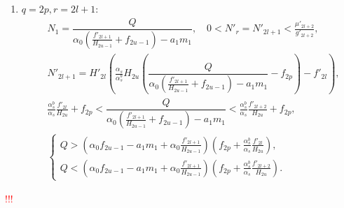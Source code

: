 \begin{enumerate}[leftmargin=10pt,itemindent=26pt]
    \item \(q=2p, r=2l+1\):
    \begin{align*}
        & N_1 = \dfrac{Q}{ \alpha_0 \left( \frac{f'_{2l+1}}{H_{2u-1}} + f_{2u-1} \right) - a_1 m_1 }, \quad 0 < N'_r = N'_{2l+1} < \frac{\mu'_{2l+2}}{g'_{2l+2}}, \\
        & N'_{2l+1} = H'_{2l} \left( \frac{\alpha_s}{\alpha^b_s} H_{2u} \left( \dfrac{Q}{ \alpha_0 \left( \frac{f'_{2l+1}}{H_{2u-1}} + f_{2u-1} \right) - a_1 m_1 } - f_{2p} \right) - f'_{2l} \right), \\
        & \frac{\alpha^b_s}{\alpha_s} \frac{f'_{2l}}{H_{2u}} + f_{2p} < \dfrac{Q}{ \alpha_0 \left( \frac{f'_{2l+1}}{H_{2u-1}} + f_{2u-1} \right) - a_1 m_1 } < \frac{\alpha^b_s}{\alpha_s} \frac{f'_{2l+2}}{H_{2u}} + f_{2p}, \\ 
        & \begin{cases}
            Q > \left( \alpha_0 f_{2u-1} - a_1 m_1  + \alpha_0 \frac{f'_{2l+1}}{H_{2u-1}}\right) \left( f_{2p} + \frac{\alpha^b_s}{\alpha_s} \frac{f'_{2l}}{H_{2u}} \right), \\
            Q < \left( \alpha_0 f_{2u-1} - a_1 m_1  + \alpha_0 \frac{f'_{2l+1}}{H_{2u-1}}\right) \left( f_{2p} + \frac{\alpha^b_s}{\alpha_s} \frac{f'_{2l+2}}{H_{2u}} \right).
        \end{cases}
    \end{align*}
\end{enumerate}

\textcolor{red}{!!!}

